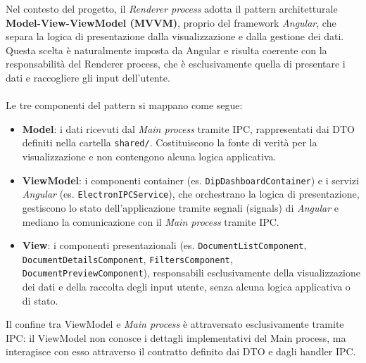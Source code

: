 \documentclass[a4paper,12pt]{article}
\begin{document}
{{{                \noindent Nel contesto del progetto, il \textit{Renderer process} adotta il pattern architetturale \textbf{Model-View-ViewModel (MVVM)}, proprio del framework \textit{Angular}, che separa la logica di presentazione dalla visualizzazione e dalla gestione dei dati.
                Questa scelta è naturalmente imposta da Angular e risulta coerente con la responsabilità del Renderer process, che è esclusivamente quella di presentare i dati e raccogliere gli input dell'utente.\\
                \\
                Le tre componenti del pattern si mappano come segue:
                \begin{itemize}
                    \item \textbf{Model}: i dati ricevuti dal \textit{Main process} tramite IPC, rappresentati dai DTO definiti nella cartella \verb|shared/|.
                    Costituiscono la fonte di verità per la visualizzazione e non contengono alcuna logica applicativa.
                    \item \textbf{ViewModel}: i componenti container (es. \texttt{DipDashboardContainer}) e i servizi \textit{Angular} (es. \texttt{ElectronIPCService}), che orchestrano la logica di presentazione, gestiscono lo stato dell'applicazione tramite segnali (signals) di \textit{Angular} e mediano la comunicazione con il \textit{Main process} tramite IPC.
                    \item \textbf{View}: i componenti presentazionali (es. \texttt{DocumentListComponent}, \texttt{DocumentDetailsComponent}, \texttt{FiltersComponent}, \texttt{DocumentPreviewComponent}), responsabili esclusivamente della visualizzazione dei dati e della raccolta degli input utente, senza alcuna logica applicativa o di stato.
                \end{itemize}

                \noindent Il confine tra ViewModel e \textit{Main process} è attraversato esclusivamente tramite IPC: il ViewModel non conosce i dettagli implementativi del Main process, ma interagisce con esso attraverso il contratto definito dai DTO e dagli handler IPC.
            }
            
}}
\end{document}
